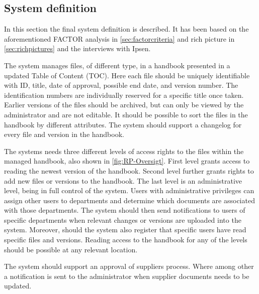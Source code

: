 \subsection{System definition}\label{sec:systemdefinition}
In this section the final system definition is described.
It has been based on the aforementioned FACTOR analysis in \cref{sec:factorcriteria} and rich picture in \cref{sec:richpictures} and the interviews with Ipsen.

The system manages files, of different type, in a handbook presented in a updated Table of Content (TOC).
Here each file should be uniquely identifiable with ID, title, date of approval, possible end date, and version number.
The identification numbers are individually reserved for a specific title once taken.
Earlier versions of the files should be archived, but can only be viewed by the administrator and are not editable.
It should be possible to sort the files in the handbook by different attributes.
The system should support a changelog for every file and version in the handbook.

The systems needs three different levels of access rights to the files within the managed handbook, also shown in \cref{fig:RP-Oversigt}.
First level grants access to reading the newest version of the handbook.
Second level further grants rights to add new files or versions to the handbook.
The last level is an administrative level, being in full control of the system.
Users with administrative privileges can assign other users to departments and determine which documents are associated with those departments.
The system should then send notifications to users of specific departments when relevant changes or versions are uploaded into the system.
Moreover, should the system also register that specific users have read specific files and versions.
Reading access to the handbook for any of the levels should be possible at any relevant location.

The system should support an approval of suppliers process.
Where among other a notification is sent to the administrator when supplier documents needs to be updated.
